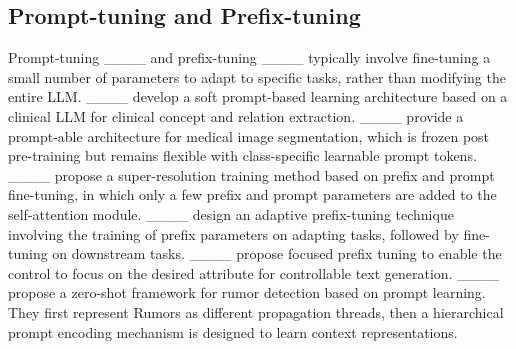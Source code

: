 
\subsection{Prompt-tuning and Prefix-tuning}

Prompt-tuning ____ and prefix-tuning ____ typically involve fine-tuning a small number of parameters to adapt to specific tasks, rather than modifying the entire LLM. ____ develop a soft prompt-based learning architecture based on a clinical LLM for clinical concept and relation extraction. ____ provide a prompt-able architecture for medical image segmentation, which is frozen post pre-training but remains flexible with class-specific learnable prompt tokens. ____ propose a super-resolution training method based on prefix and prompt fine-tuning, in which only a few prefix and prompt parameters are added to the self-attention module. ____ design an adaptive prefix-tuning technique involving the training of prefix parameters on adapting tasks, followed by fine-tuning on downstream tasks. ____ propose focused prefix tuning to enable the control to focus on the desired attribute for controllable text generation. ____ propose a zero-shot framework for rumor detection based on prompt learning. They first represent Rumors as different propagation threads, then a hierarchical prompt encoding mechanism is designed to learn context representations.